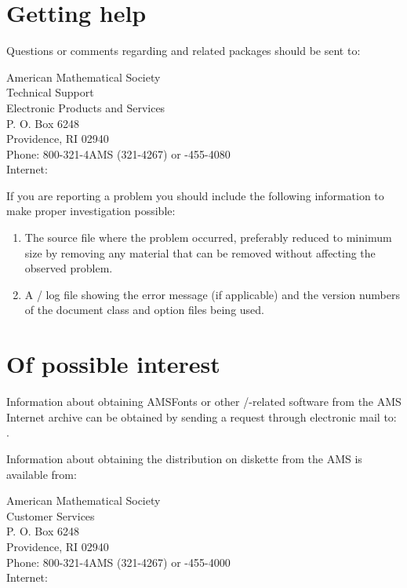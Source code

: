 \documentclass[leqno,titlepage,openany]{amsldoc}[1999/12/13]
\newenvironment{infoaddress}{%
  \par\topsep\medskipamount
  \trivlist\centering
  \item[]%
  \begin{minipage}{.7\columnwidth}%
  \raggedright
}{%
  \end{minipage}%
  \endtrivlist
}
\begin{document}
\section{Getting help}

Questions or comments regarding  and related packages
should be sent to:
\begin{infoaddress}
American Mathematical Society\\
Technical Support\\
Electronic Products and Services\\
P. O. Box 6248\\
Providence, RI 02940\\[3pt]
Phone: 800-321-4AMS (321-4267) \quad or -455-4080\\
Internet: 
\end{infoaddress}
If you are reporting a problem you should include
the following information to make proper investigation possible:
\begin{enumerate}
\item The source file where the problem occurred, preferably reduced
  to minimum size by removing any material that can be removed without
  affecting the observed problem.
\item A \latex/ log file showing the error message (if applicable) and
  the version numbers of the document class and option files being used.
\end{enumerate}

\section{Of possible interest}\label{a:possible-interest}
Information about obtaining AMSFonts or other \tex/-related
software from the AMS Internet archive 
can be obtained by sending a request through electronic mail to:
.

Information about obtaining the  distribution on diskette
from the AMS is available from:
\begin{infoaddress}
American Mathematical Society\\
Customer Services\\
P. O. Box 6248\\
Providence, RI 02940\\[3pt]
Phone: 800-321-4AMS (321-4267) \quad or -455-4000\\
Internet: 
\end{infoaddress}
\end{document}
